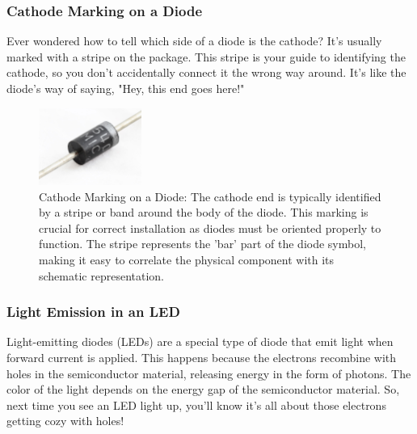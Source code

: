 \subsubsection*{Cathode Marking on a Diode}
Ever wondered how to tell which side of a diode is the cathode? It's usually marked with a stripe on the package. This stripe is your guide to identifying the cathode, so you don't accidentally connect it the wrong way around. It's like the diode's way of saying, "Hey, this end goes here!"

\begin{figure}[th]
    \centering
    \includegraphics[width=0.3\textwidth]{tech/images/diode.jpeg}
    \caption{Cathode Marking on a Diode: The cathode end is typically identified by a stripe or band around the body of the diode. This marking is crucial for correct installation as diodes must be oriented properly to function. The stripe represents the 'bar' part of the diode symbol, making it easy to correlate the physical component with its schematic representation.}
    \label{fig:cathode_marking}
\end{figure}

\subsubsection*{Light Emission in an LED}
Light-emitting diodes (LEDs) are a special type of diode that emit light when forward current is applied. This happens because the electrons recombine with holes in the semiconductor material, releasing energy in the form of photons. The color of the light depends on the energy gap of the semiconductor material. So, next time you see an LED light up, you'll know it's all about those electrons getting cozy with holes!

